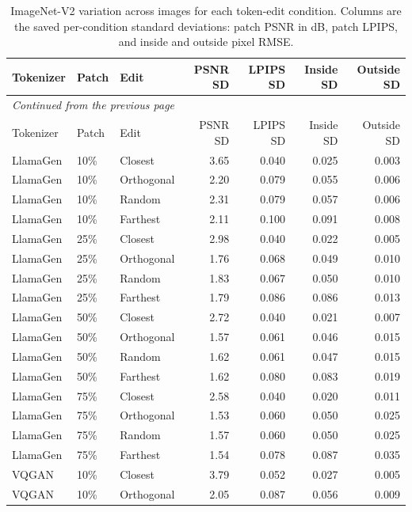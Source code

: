 \begingroup
\small
\setlength{\tabcolsep}{4pt}
\begin{longtable}{lllrrrr}
\caption[ImageNet-V2 variation across images for each token-edit condition]{ImageNet-V2 variation across images for each token-edit condition. Columns are the saved per-condition standard deviations: patch PSNR in dB, patch LPIPS, and inside and outside pixel RMSE.}\label{tab:app_imagenetv2_variability}\\
\hline
Tokenizer & Patch & Edit & PSNR SD & LPIPS SD & Inside SD & Outside SD \\ \hline
\endfirsthead
\multicolumn{7}{l}{\small\itshape Continued from the previous page}\\
\hline
Tokenizer & Patch & Edit & PSNR SD & LPIPS SD & Inside SD & Outside SD \\ \hline
\endhead
\hline
\endfoot
LlamaGen & 10\% & Closest & 3.65 & 0.040 & 0.025 & 0.003 \\
LlamaGen & 10\% & Orthogonal & 2.20 & 0.079 & 0.055 & 0.006 \\
LlamaGen & 10\% & Random & 2.31 & 0.079 & 0.057 & 0.006 \\
LlamaGen & 10\% & Farthest & 2.11 & 0.100 & 0.091 & 0.008 \\
LlamaGen & 25\% & Closest & 2.98 & 0.040 & 0.022 & 0.005 \\
LlamaGen & 25\% & Orthogonal & 1.76 & 0.068 & 0.049 & 0.010 \\
LlamaGen & 25\% & Random & 1.83 & 0.067 & 0.050 & 0.010 \\
LlamaGen & 25\% & Farthest & 1.79 & 0.086 & 0.086 & 0.013 \\
LlamaGen & 50\% & Closest & 2.72 & 0.040 & 0.021 & 0.007 \\
LlamaGen & 50\% & Orthogonal & 1.57 & 0.061 & 0.046 & 0.015 \\
LlamaGen & 50\% & Random & 1.62 & 0.061 & 0.047 & 0.015 \\
LlamaGen & 50\% & Farthest & 1.62 & 0.080 & 0.083 & 0.019 \\
LlamaGen & 75\% & Closest & 2.58 & 0.040 & 0.020 & 0.011 \\
LlamaGen & 75\% & Orthogonal & 1.53 & 0.060 & 0.050 & 0.025 \\
LlamaGen & 75\% & Random & 1.57 & 0.060 & 0.050 & 0.025 \\
LlamaGen & 75\% & Farthest & 1.54 & 0.078 & 0.087 & 0.035 \\
VQGAN & 10\% & Closest & 3.79 & 0.052 & 0.027 & 0.005 \\
VQGAN & 10\% & Orthogonal & 2.05 & 0.087 & 0.056 & 0.009 \\

\end{longtable}

